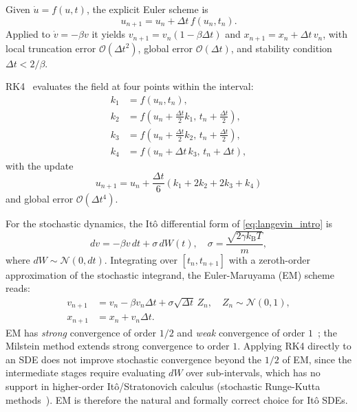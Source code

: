\documentclass[aps,prl,twocolumn,showpacs,superscriptaddress,longbibliography]{revtex4-2}
\newcommand{\kB}{k_{\mathrm{B}}}
\newcommand{\dt}{\Delta t}
\begin{document}
Given $\dot{u}=f(u,t)$, the explicit Euler scheme is
\begin{equation}
	u_{n+1} = u_n + \dt\,f(u_n,t_n).
\end{equation}
Applied to $\dot{v}=-\beta v$ it yields $v_{n+1} = v_n(1-\beta\dt)$
and $x_{n+1}=x_n+\dt\,v_n$, with local truncation error
$\mathcal{O}(\dt^2)$, global error $\mathcal{O}(\dt)$, and stability
condition $\dt<2/\beta$.

RK4~\cite{Press2007} evaluates the field at four points within the
interval:
\begin{subequations}
	\label{eq:rk4}
	\begin{align}
		k_1 &= f(u_n,t_n),\\
		k_2 &= f\!\left(u_n+\tfrac{\dt}{2}k_1,\,t_n+\tfrac{\dt}{2}\right),\\
		k_3 &= f\!\left(u_n+\tfrac{\dt}{2}k_2,\,t_n+\tfrac{\dt}{2}\right),\\
		k_4 &= f\!\left(u_n+\dt\,k_3,\,t_n+\dt\right),
	\end{align}
\end{subequations}
with the update
\begin{equation}
	u_{n+1} = u_n + \frac{\dt}{6}(k_1+2k_2+2k_3+k_4)
\end{equation}
and global error $\mathcal{O}(\dt^4)$.

For the stochastic dynamics, the Itô differential form of
\eqref{eq:langevin_intro} is
\begin{equation}
	dv = -\beta v\,dt + \sigma\,dW(t),\quad
	\sigma = \frac{\sqrt{2\gamma\kB T}}{m},
\end{equation}
where $dW\sim\mathcal{N}(0,dt)$.  Integrating over $[t_n,t_{n+1}]$
with a zeroth-order approximation of the stochastic integrand, the
Euler-Maruyama (EM) scheme reads:
\begin{subequations}
	\label{eq:em}
	\begin{align}
		v_{n+1} &= v_n - \beta v_n\dt + \sigma\sqrt{\dt}\,Z_n,\quad
		Z_n\sim\mathcal{N}(0,1), \\
		x_{n+1} &= x_n + v_n\dt.
	\end{align}
\end{subequations}
EM has \textit{strong} convergence of order $1/2$ and \textit{weak}
convergence of order $1$~\cite{Kloeden1992}; the Milstein method
extends strong convergence to order $1$.  Applying RK4 directly to an
SDE does not improve stochastic convergence beyond the $1/2$ of EM,
since the intermediate stages require evaluating $dW$ over
sub-intervals, which has no support in higher-order
Itô/Stratonovich calculus (stochastic Runge-Kutta
methods~\cite{Leimkuhler2015}).  EM is therefore the natural and
formally correct choice for Itô SDEs.
\end{document}
